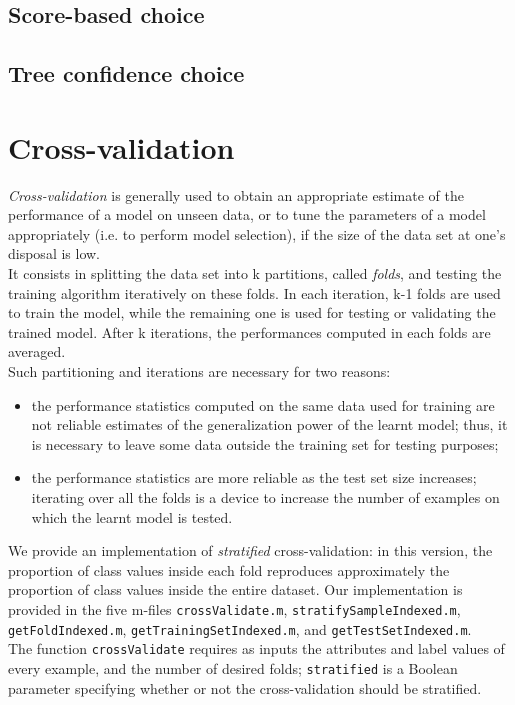 \documentclass{article}
\begin{document}
\subsection{Score-based choice}

\subsection{Tree confidence choice}

\section{Cross-validation}
\emph{Cross-validation} is generally used to obtain an appropriate estimate of the performance of a model on unseen data, or to tune the parameters of a model appropriately (i.e. to perform model selection), if the size of the data set at one's disposal is low.\\
It consists in splitting the data set into k partitions, called \emph{folds}, and testing the training algorithm iteratively on these folds. In each iteration, k-1 folds are used to train the model, while the remaining one is used for testing or validating the trained model. After k iterations, the performances computed in each folds are averaged.\\
Such partitioning and iterations are necessary for two reasons:
\begin{itemize}
	\item the performance statistics computed on the same data used for training are not reliable estimates of the generalization power of the learnt model; thus, it is necessary to leave some data outside the training set for testing purposes;
	\item the performance statistics are more reliable as the test set size increases; iterating over all the folds is a device to increase the number of examples on which the learnt model is tested.
\end{itemize}
We provide an implementation of \emph{stratified} cross-validation: in this version, the proportion of class values inside each fold reproduces approximately the proportion of class values inside the entire dataset. Our implementation is provided in the five m-files \verb$crossValidate.m$, \verb$stratifySampleIndexed.m$, \verb$getFoldIndexed.m$, \verb$getTrainingSetIndexed.m$, and \verb$getTestSetIndexed.m$.\\
The function \verb$crossValidate$ requires as inputs the attributes and label values of every example, and the number of desired folds; \verb$stratified$ is a Boolean parameter specifying whether or not the cross-validation should be stratified.
\end{document}
